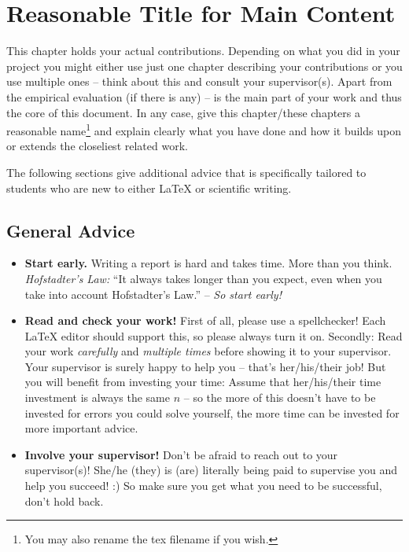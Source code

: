\chapter{Reasonable Title for Main Content}\label{chap:content}

This chapter holds your actual contributions. Depending on what you did in your project you might either use just one chapter describing your contributions or you use multiple ones -- think about this and consult your supervisor(s). Apart from the empirical evaluation (if there is any) -- is the main part of your work and thus the core of this document. In any case, give this chapter/these chapters a reasonable name\footnote{You may also rename the tex filename if you wish.} and explain clearly what you have done and how it builds upon or extends the closeliest related work.

The following sections give additional advice that is specifically tailored to students who are new to either \LaTeX{} or scientific writing.



\section{General Advice}

\begin{itemize}
 \item \textbf{Start early.} Writing a report is hard and takes time. More than you think. \emph{Hofstadter's Law:} ``It always takes longer than you expect, even when you take into account Hofstadter's Law.'' -- \emph{So start early!}
 \item \textbf{Read and check your work!} First of all, please use a spellchecker! Each \LaTeX{} editor should support this, so please always turn it on. Secondly: Read your work \emph{carefully} and \emph{multiple times} before showing it to your supervisor. Your supervisor is surely happy to help you -- that's her/his/their job! But you will benefit from investing your time: Assume that her/his/their time investment is always the same $n$ -- so the more of this doesn't have to be invested for errors you could solve yourself, the more time can be invested for more important advice.
 \item \textbf{Involve your supervisor!} Don't be afraid to reach out to your supervisor(s)! She/he (they) is (are) literally being paid to supervise you and help you succeed! :) So make sure you get what you need to be successful, don't hold back.
\end{itemize}


